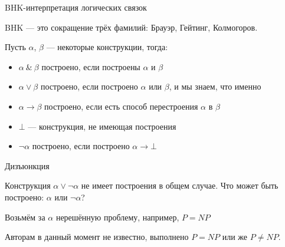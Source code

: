 \documentclass[aspectratio=169]{beamer}
\begin{document}
\begin{frame}{BHK-интерпретация логических связок}

BHK — это сокращение трёх фамилий: Брауэр, Гейтинг, Колмогоров. \pause

\vspace{1cm}

Пусть $\alpha$, $\beta$ --- некоторые конструкции, тогда:\pause

\begin{itemize}
\item $\alpha\ \&\ \beta$ построено, если построены $\alpha$ и $\beta$ \pause
\item $\alpha \vee \beta$ построено, если построено $\alpha$ или $\beta$,
и мы знаем, что именно \pause
\item $\alpha\rightarrow\beta$ построено, если есть способ перестроения
$\alpha$ в $\beta$\pause
\item $\bot$ — конструкция, не имеющая построения\pause
\item $\neg\alpha$ построено, если построено $\alpha\rightarrow\bot$
\end{itemize}
\end{frame}

\begin{frame}{Дизъюнкция}

Конструкция $\alpha\vee\neg\alpha$ не имеет построения в общем случае.
Что может быть построено: $\alpha$ или $\neg\alpha$?\pause

\vspace{1cm}

Возьмём за $\alpha$ нерешённую проблему, например, $P = NP$\pause
\vspace{1cm}

Авторам в данный момент не известно, выполнено $P = NP$ или же $P \ne NP$.
\end{frame}
\end{document}
